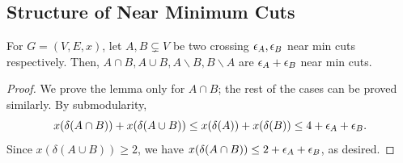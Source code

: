 \subsection{Structure of Near Minimum Cuts}\label{sec:structure-NMC}


\begin{lemma}\label{lem:cutdecrement}
For $G=(V,E,x)$, let $A,B\subsetneq V$ be two crossing ${\epsilon}_A, {\epsilon}_B$ near min cuts respectively. Then,
$A\cap B, A\cup B, A\smallsetminus B, B\smallsetminus A$ are ${\epsilon}_A+{\epsilon}_B$ near min cuts.
\end{lemma}
\begin{proof}
We prove the lemma only for $A\cap B$; the rest of the cases can be proved similarly.
By submodularity,
$$ x(\delta(A\cap B)) + x(\delta(A\cup B)) \leq x(\delta(A)) + x(\delta(B)) \leq 4+{\epsilon}_A+{\epsilon}_B.$$
Since $x(\delta(A\cup B))\geq 2$, we have $x(\delta(A\cap B))\leq 2+\epsilon_A+{\epsilon}_B$, as desired.
\end{proof}

